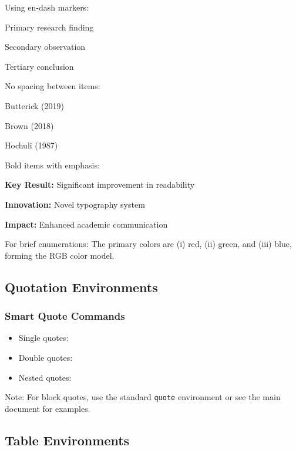  Using en-dash markers:
\begin{academicitem}
\item Primary research finding
\item Secondary observation
\item Tertiary conclusion
\end{academicitem}

No spacing between items:
\begin{compactitem}
\item Butterick (2019)
\item Brown (2018)
\item Hochuli (1987)
\end{compactitem}

Bold items with emphasis:
\begin{displayitem}
\item \textbf{Key Result:} Significant improvement in readability
\item \textbf{Innovation:} Novel typography system
\item \textbf{Impact:} Enhanced academic communication
\end{displayitem}

For brief enumerations:
The primary colors are (i) red, (ii) green, and (iii) blue, forming the RGB color model.

\subsection{Quotation Environments}

\subsubsection{Smart Quote Commands}

\begin{itemize}
\item Single quotes: 
\item Double quotes: 
\item Nested quotes: 
\end{itemize}

Note: For block quotes, use the standard \texttt{quote} environment or see the main document for examples.

\subsection{Table Environments}

